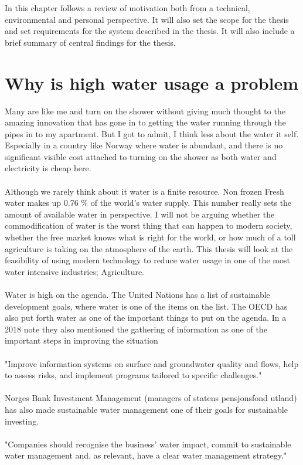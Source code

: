 \documentclass[]{uiophd}
\begin{document}
In this chapter follows a review of motivation both from a technical, environmental and personal perspective. It will also set the scope for the thesis and set requirements for the system described in the thesis. It will also include a brief summary of central findings for the thesis.

\section{Why is high water usage a problem}
Many are like me and turn on the shower without giving much thought to the amazing innovation that has gone in to getting the water running through the pipes in to my apartment. But I got to admit, I think less about the water it self. Especially in a country like Norway where water is abundant, and there is no significant visible cost attached to turning on the shower as both water and electricity is cheap here.
\\\\
Although we rarely think about it water is a finite resource. Non frozen Fresh water makes up 0.76 \% of the world's water supply. \cite{WaterinCrisis} This number really sets the amount of available water in perspective. I will not be arguing whether the commodification of water is the worst thing that can happen to modern society, whether the free market knows what is right for the world, or how much of a toll agriculture is taking on the atmosphere of the earth. This thesis will look at the feasibility of using modern technology to reduce water usage in one of the most water intensive industries; Agriculture. \cite{WorldBank}
\\\\
Water is high on the agenda. The United Nations has a list of sustainable development goals, where water is one of the items on the list. The OECD has also put forth water as one of the important things to put on the agenda. In a 2018 note they also mentioned the gathering of information as one of the important steps in improving the situation 
\\\\
"Improve information systems on surface and groundwater quality and flows, help to assess risks, and implement programs tailored to specific challenges."\cite{OECD}
\\\\
Norges Bank Investment Management (managers of statens pensjonsfond utland) has also made sustainable water management one of their goals for sustainable investing. 
\\\\
"Companies should recognise the business’
water impact, commit to sustainable water
management and, as relevant, have a clear
water management strategy." \cite{NBIM}
\end{document}
